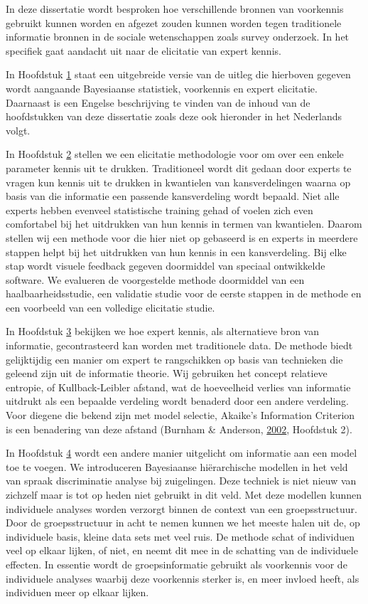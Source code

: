 \documentclass[openright,titlepage,12pt,a4paper]{book}
\begin{document}
In deze dissertatie wordt besproken hoe verschillende bronnen van voorkennis gebruikt kunnen worden en afgezet zouden kunnen worden tegen traditionele informatie bronnen in de sociale wetenschappen zoals survey onderzoek. In het specifiek gaat aandacht uit naar de elicitatie van expert kennis.

In Hoofdstuk \protect\hyperlink{introduction}{1} staat een uitgebreide versie van de uitleg die hierboven gegeven wordt aangaande Bayesiaanse statistiek, voorkennis en expert elicitatie. Daarnaast is een Engelse beschrijving te vinden van de inhoud van de hoofdstukken van deze dissertatie zoals deze ook hieronder in het Nederlands volgt.

In Hoofdstuk \protect\hyperlink{fivestep}{2} stellen we een elicitatie methodologie voor om over een enkele parameter kennis uit te drukken. Traditioneel wordt dit gedaan door experts te vragen kun kennis uit te drukken in kwantielen van kansverdelingen waarna op basis van die informatie een passende kansverdeling wordt bepaald. Niet alle experts hebben evenveel statistische training gehad of voelen zich even comfortabel bij het uitdrukken van hun kennis in termen van kwantielen. Daarom stellen wij een methode voor die hier niet op gebaseerd is en experts in meerdere stappen helpt bij het uitdrukken van hun kennis in een kansverdeling. Bij elke stap wordt visuele feedback gegeven doormiddel van speciaal ontwikkelde software. We evalueren de voorgestelde methode doormiddel van een haalbaarheidsstudie, een validatie studie voor de eerste stappen in de methode en een voorbeeld van een volledige elicitatie studie.

In Hoofdstuk \protect\hyperlink{DAC1}{3} bekijken we hoe expert kennis, als alternatieve bron van informatie, gecontrasteerd kan worden met traditionele data. De methode biedt gelijktijdig een manier om expert te rangschikken op basis van technieken die geleend zijn uit de informatie theorie. Wij gebruiken het concept relatieve entropie, of Kullback-Leibler afstand, wat de hoeveelheid verlies van informatie uitdrukt als een bepaalde verdeling wordt benaderd door een andere verdeling. Voor diegene die bekend zijn met model selectie, Akaike's Information Criterion is een benadering van deze afstand (Burnham \& Anderson, \protect\hyperlink{ref-burnham_model_2002}{2002}, Hoofdstuk 2).

In Hoofdstuk \protect\hyperlink{Hierarchical}{4} wordt een andere manier uitgelicht om informatie aan een model toe te voegen. We introduceren Bayesiaanse hiërarchische modellen in het veld van spraak discriminatie analyse bij zuigelingen. Deze techniek is niet nieuw van zichzelf maar is tot op heden niet gebruikt in dit veld. Met deze modellen kunnen individuele analyses worden verzorgt binnen de context van een groepsstructuur. Door de groepsstructuur in acht te nemen kunnen we het meeste halen uit de, op individuele basis, kleine data sets met veel ruis. De methode schat of individuen veel op elkaar lijken, of niet, en neemt dit mee in de schatting van de individuele effecten. In essentie wordt de groepsinformatie gebruikt als voorkennis voor de individuele analyses waarbij deze voorkennis sterker is, en meer invloed heeft, als individuen meer op elkaar lijken.
\end{document}
